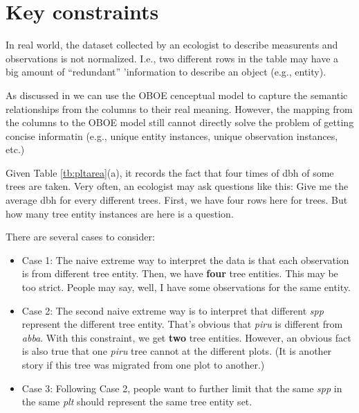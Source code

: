 \documentclass[10pt]{article}
\begin{document}
\section{Key constraints}
 
In real world, the dataset collected by an ecologist to describe
measurents and observations is not normalized. I.e., two different
rows in the table may have a big amount of ``redundant'' 'information
to describe an object (e.g., entity). 

As discussed in \cite{***} %
we can use the OBOE cenceptual model to capture the semantic
relationships from the columns to their real meaning. 
However, the mapping from the columns to the OBOE model still cannot
directly solve the problem of getting concise informatin (e.g., unique
entity instances, unique observation instances, etc.)

Given Table \ref{tb:pltarea}(a), it records the fact that four times
of dbh of some trees are taken. 
Very often, an ecologist may ask questions like this:  Give me the
average dbh for every different trees. 
First, we have four rows here for trees. 
But how many tree entity instances are here is a question. 

There are several cases to consider:
\begin{itemize}
\item Case 1: The naive extreme way to interpret the data is that each
  observation is from different tree entity. Then, we have {\bf four}
  tree entities. This may be too strict. People may say, well, I have
  some observations for the same entity. 
\item Case 2: The second naive extreme way is to interpret that different {\em spp} represent the different tree entity. 
That's obvious that {\em piru} is different from {\em abba}. 
With this constraint, we get {\bf two} tree entities. However, an
obvious fact is also true that one {\em piru} tree cannot at the
different plots. (It is another story if this tree was migrated from one plot to another.) 
\item Case 3: Following Case 2, people want to further limit that the
  same {\em spp} in the same {\em plt} should represent the same tree
  entity set.  
\end{itemize}

\end{document}
